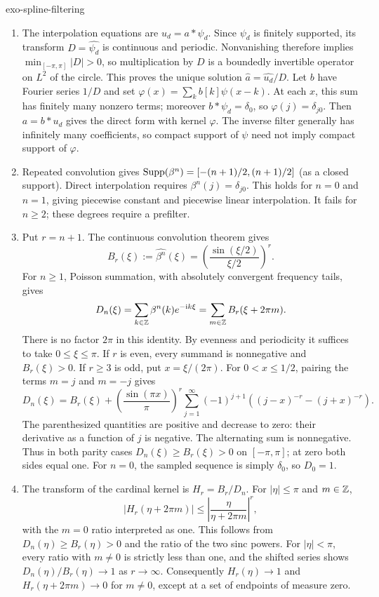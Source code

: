 \begin{correction}{exo-spline-filtering}
\begin{enumerate}
\item The interpolation equations are $u_d=a*\psi_d$.
Since $\psi_d$ is finitely supported, its transform $D=\widehat{\psi_d}$
is continuous and periodic. Nonvanishing therefore implies
$\min_{[-\pi,\pi]}|D|>0$, so multiplication by $D$ is a boundedly
invertible operator on $L^2$ of the circle. This proves the unique solution
$\widehat a=\widehat{u_d}/D$.
Let $b$ have Fourier series $1/D$ and set
$\varphi(x)=\sum_kb[k]\psi(x-k)$. At each $x$, this sum has finitely many
nonzero terms; moreover $b*\psi_d=\delta_0$, so $\varphi(j)=\delta_{j0}$.
Then $a=b*u_d$ gives the direct form with kernel $\varphi$.
The inverse filter generally has infinitely many coefficients, so compact
support of $\psi$ need not imply compact support of $\varphi$.
\item Repeated convolution gives
$\operatorname{Supp}(\beta^n)=[-(n+1)/2,(n+1)/2]$ (as a closed support).
Direct interpolation requires $\beta^n(j)=\delta_{j0}$.
This holds for $n=0$ and $n=1$, giving piecewise constant and piecewise linear
interpolation. It fails for $n\geq2$; these degrees require a prefilter.
\item Put $r=n+1$. The continuous convolution theorem gives
\[
 B_r(\xi):=\widehat{\beta^n}(\xi)
          =\left(\frac{\sin(\xi/2)}{\xi/2}\right)^r.
\]
For $n\geq1$, Poisson summation, with absolutely convergent frequency tails,
gives
\[
 D_n(\xi)=\sum_{k\in\mathbb{Z}}\beta^n(k)e^{-\mathrm{i} k\xi}
         =\sum_{m\in\mathbb{Z}}B_r(\xi+2\pi m).
\]
There is no factor $2\pi$ in this identity. By evenness and periodicity it
suffices to take $0\leq\xi\leq\pi$.
If $r$ is even, every summand is nonnegative and $B_r(\xi)>0$.
If $r\geq3$ is odd, put $x=\xi/(2\pi)$. For $0<x\leq1/2$, pairing the
terms $m=j$ and $m=-j$ gives
\[
 D_n(\xi)=B_r(\xi)+\left(\frac{\sin(\pi x)}\pi\right)^r
 \sum_{j=1}^\infty(-1)^{j+1}
       \left((j-x)^{-r}-(j+x)^{-r}\right).
\]
The parenthesized quantities are positive and decrease to zero: their
derivative as a function of $j$ is negative. The alternating sum is
nonnegative. Thus in both parity cases
$D_n(\xi)\geq B_r(\xi)>0$ on $[-\pi,\pi]$; at zero both sides equal one.
For $n=0$, the sampled sequence is simply $\delta_0$, so $D_0=1$.
\item The transform of the cardinal kernel is $H_r=B_r/D_n$.
For $|\eta|\leq\pi$ and $m\in\mathbb{Z}$,
\[
 |H_r(\eta+2\pi m)|
 \leq\left|\frac{\eta}{\eta+2\pi m}\right|^r,
\]
with the $m=0$ ratio interpreted as one. This follows from
$D_n(\eta)\geq B_r(\eta)>0$ and the ratio of the two sinc powers.
For $|\eta|<\pi$, every ratio with $m\ne0$ is strictly less than one, and
the shifted series shows $D_n(\eta)/B_r(\eta)\to1$ as $r\to\infty$.
Consequently $H_r(\eta)\to1$ and $H_r(\eta+2\pi m)\to0$ for $m\ne0$,
except at a set of endpoints of measure zero.


\end{enumerate}
\end{correction}
